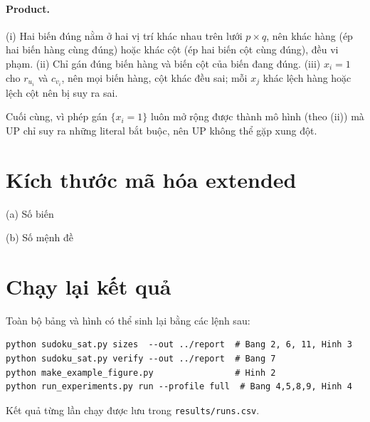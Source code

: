 \documentclass[a4paper,fleqn]{cas-sc}
\begin{document}
\paragraph{Product.} (i) Hai biến đúng nằm ở hai vị trí khác nhau trên lưới $p\times q$, nên khác hàng (ép hai biến hàng cùng đúng) hoặc khác cột (ép hai biến cột cùng đúng), đều vi phạm. (ii) Chỉ gán đúng biến hàng và biến cột của biến đang đúng. (iii) $x_i=1$ cho $r_{u_i}$ và $c_{v_i}$, nên mọi biến hàng, cột khác đều sai; mỗi $x_j$ khác lệch hàng hoặc lệch cột nên bị suy ra sai.

Cuối cùng, vì phép gán $\{x_i=1\}$ luôn mở rộng được thành mô hình (theo (ii)) mà UP chỉ suy ra những literal bắt buộc, nên UP không thể gặp xung đột.

\section{Kích thước mã hóa extended}\label{app:tables}

\begin{table}[h]
\caption{Mã hóa extended (chưa tính ô cho trước): (a) số biến, (b) số mệnh đề. Giá trị nhỏ nhất trên mỗi hàng được in đậm.}
\label{tab:size-ext}
\centering\small
(a) Số biến\par\smallskip
\par\bigskip
(b) Số mệnh đề\par\smallskip

\end{table}

\section{Chạy lại kết quả}\label{app:repro}

Toàn bộ bảng và hình có thể sinh lại bằng các lệnh sau:
\begin{verbatim}
python sudoku_sat.py sizes  --out ../report  # Bang 2, 6, 11, Hinh 3
python sudoku_sat.py verify --out ../report  # Bang 7
python make_example_figure.py                # Hinh 2
python run_experiments.py run --profile full  # Bang 4,5,8,9, Hinh 4
\end{verbatim}
Kết quả từng lần chạy được lưu trong \texttt{results/runs.csv}.



\end{document}
